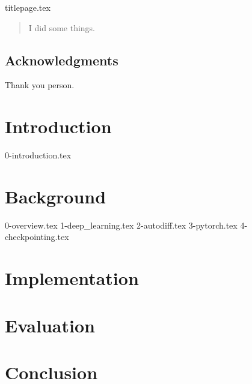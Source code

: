 \documentclass[12pt,twoside]{report}
\begin{document}
{titlepage.tex}

\clearpage{\pagestyle{empty}\cleardoublepage}
\setcounter{page}{1}
\pagestyle{fancy}

\begin{abstract}
I did some things.
\end{abstract}

\cleardoublepage
\section*{Acknowledgments}
Thank you person.

\clearpage{\pagestyle{empty}\cleardoublepage}

\tableofcontents 


\clearpage{\pagestyle{empty}\cleardoublepage}
\setcounter{page}{1}
\fancyhead[LE,RO]{\slshape \rightmark}
\fancyhead[LO,RE]{\slshape \leftmark}

\chapter{Introduction}
{0-introduction.tex}


\chapter{Background}
{0-overview.tex}
{1-deep_learning.tex}
{2-autodiff.tex}
{3-pytorch.tex}
{4-checkpointing.tex}


\chapter{Implementation}


\chapter{Evaluation}


\chapter{Conclusion}



\end{document}
